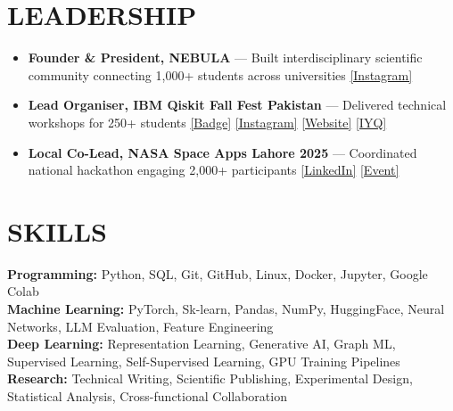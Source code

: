 \documentclass[letterpaper,9pt]{article}
\newcommand{\resumeItem}[1]{
  \item \small{#1}
}
\begin{document}
\section{LEADERSHIP}
\begin{itemize}
\resumeItem{\textbf{Founder \& President, NEBULA} — Built interdisciplinary scientific community connecting 1,000+ students across universities \href{https://www.instagram.com/nebula_headquarters?igsh=Ymc5ZXB4ZDAwa3Bx&utm_source=qr}{[Instagram]}}
\resumeItem{\textbf{Lead Organiser, IBM Qiskit Fall Fest Pakistan} — Delivered technical workshops for 250+ students \href{https://www.credly.com/badges/14eefc17-88e5-4e48-b0e8-ecb932ab0d6b/public_url}{[Badge]} \href{https://www.instagram.com/ibm_qiskit_itu/}{[Instagram]} \href{https://ibm-qiskit-fall-fest2025.vercel.app/}{[Website]} \href{https://quantum2025.org/iyq-event/ibm-qiskit-fall-fest-at-itu-pakistan/}{[IYQ]}}
\resumeItem{\textbf{Local Co-Lead, NASA Space Apps Lahore 2025} — Coordinated national hackathon engaging 2,000+ participants \href{https://www.linkedin.com/feed/update/urn:li:activity:7381065596311879680/}{[LinkedIn]} \href{https://www.spaceappschallenge.org/2025/local-events/lahore/}{[Event]}}
\end{itemize}

\section{SKILLS}
\small{
\textbf{Programming:} Python, SQL, Git, GitHub, Linux, Docker, Jupyter, Google Colab \\
\textbf{Machine Learning:} PyTorch, Sk-learn, Pandas, NumPy, HuggingFace, Neural Networks, LLM Evaluation, Feature Engineering \\
\textbf{Deep Learning:} Representation Learning, Generative AI, Graph ML, Supervised Learning, Self-Supervised Learning, GPU Training Pipelines \\
\textbf{Research:} Technical Writing, Scientific Publishing, Experimental Design, Statistical Analysis, Cross-functional Collaboration
}
\end{document}
